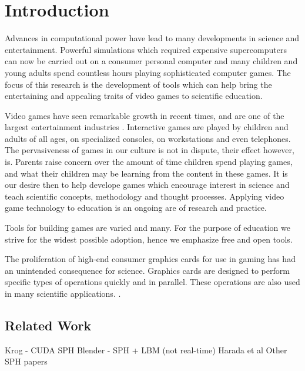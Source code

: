 \chapter{Introduction}

Advances in computational power have lead to many developments in science and
entertainment. Powerful simulations which required expensive supercomputers can
now be carried out on a consumer personal computer and many children and young
adults spend countless hours playing sophisticated computer games. The focus of
this research is the development of tools which can help bring the entertaining
and appealing traits of video games to scientific education.


Video games have seen remarkable growth in recent times, and are one of the
largest entertainment industries \cite{needed}. Interactive games are played by
children and adults of all ages, on specialized consoles, on workstations and
even telephones. The pervasiveness of games in our culture is not in dispute,
their effect however, is. Parents raise concern over the amount of time
children spend playing games, and what their children may be learning from the
content in these games. It is our desire then to help develope games which
encourage interest in science and teach scientific concepts, methodology and
thought processes. Applying video game technology to education is an ongoing
are of research and practice\cite{needed}. 


Tools for building games are varied and many. For the purpose of education we
strive for the widest possible adoption, hence we emphasize free and open
tools. 


The proliferation of high-end consumer graphics cards for use in gaming has had
an unintended consequence for science. Graphics cards are designed to perform
specific types of operations quickly and in parallel. These operations are also
used in many scientific applications.  .\cite{OpenCL}


\section{Related Work}

Krog - CUDA SPH
Blender - SPH + LBM (not real-time)
Harada et al
Other SPH papers
